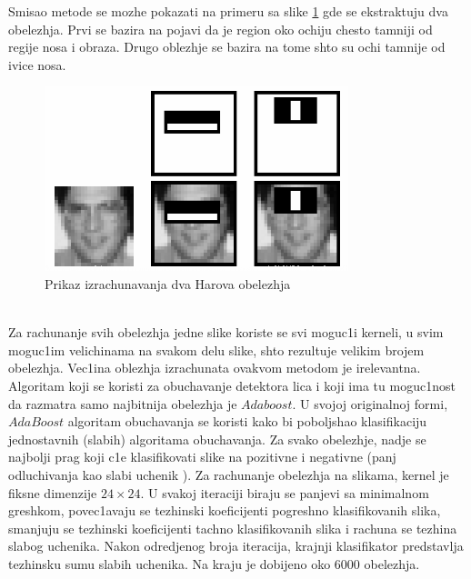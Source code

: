 \documentclass[a4paper, openany, oneside, 11pt]{book}
\begin{document}
Smisao metode se mozhe pokazati na primeru sa slike \ref{fig:2_2} gde se ekstraktuju dva obelezhja. Prvi se bazira na pojavi da je region oko ochiju chesto tamniji od regije nosa i obraza. Drugo oblezhje se bazira na tome shto su ochi tamnije od ivice nosa.
\begin{figure}[h!]
\centering
  \includegraphics[scale=0.6]{res/haar_features.png}
  \caption{Prikaz izrachunavanja dva Harova obelezhja}
  \label{fig:2_2}
  \vspace{0pt}
\end{figure}\\
Za rachunanje svih obelezhja jedne slike koriste se svi moguc1i kerneli, u svim moguc1im velichinama na svakom delu slike, shto rezultuje velikim brojem obelezhja. Vec1ina oblezhja izrachunata ovakvom metodom je irelevantna. Algoritam koji se koristi za obuchavanje detektora lica i koji ima tu moguc1nost da razmatra samo najbitnija obelezhja je $Adaboost$. U svojoj originalnoj formi, $AdaBoost$ algoritam obuchavanja se koristi kako bi poboljshao klasifikaciju jednostavnih (slabih) algoritama obuchavanja. Za svako obelezhje, nadje se najbolji prag koji c1e klasifikovati slike na pozitivne i negativne  (panj odluchivanja kao slabi uchenik \cite{MUpredavanja}). Za rachunanje obelezhja na slikama, kernel je fiksne dimenzije $24\times24$. U svakoj iteraciji biraju se panjevi sa minimalnom greshkom, povec1avaju se tezhinski koeficijenti pogreshno klasifikovanih slika, smanjuju se tezhinski koeficijenti tachno klasifikovanih slika i rachuna se tezhina slabog uchenika. Nakon odredjenog broja iteracija, krajnji klasifikator predstavlja tezhinsku sumu slabih uchenika. Na kraju je dobijeno oko 6000 obelezhja.\\
\end{document}
